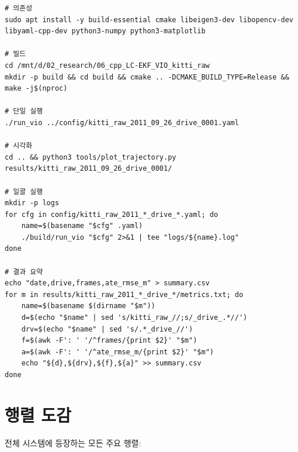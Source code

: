 \documentclass[11pt,a4paper,oneside]{report}
\begin{document}
\begin{lstlisting}[style=shell]
# 의존성
sudo apt install -y build-essential cmake libeigen3-dev libopencv-dev libyaml-cpp-dev python3-numpy python3-matplotlib

# 빌드
cd /mnt/d/02_research/06_cpp_LC-EKF_VIO_kitti_raw
mkdir -p build && cd build && cmake .. -DCMAKE_BUILD_TYPE=Release && make -j$(nproc)

# 단일 실행
./run_vio ../config/kitti_raw_2011_09_26_drive_0001.yaml

# 시각화
cd .. && python3 tools/plot_trajectory.py results/kitti_raw_2011_09_26_drive_0001/

# 일괄 실행
mkdir -p logs
for cfg in config/kitti_raw_2011_*_drive_*.yaml; do
    name=$(basename "$cfg" .yaml)
    ./build/run_vio "$cfg" 2>&1 | tee "logs/${name}.log"
done

# 결과 요약
echo "date,drive,frames,ate_rmse_m" > summary.csv
for m in results/kitti_raw_2011_*_drive_*/metrics.txt; do
    name=$(basename $(dirname "$m"))
    d=$(echo "$name" | sed 's/kitti_raw_//;s/_drive_.*//')
    drv=$(echo "$name" | sed 's/.*_drive_//')
    f=$(awk -F': ' '/^frames/{print $2}' "$m")
    a=$(awk -F': ' '/^ate_rmse_m/{print $2}' "$m")
    echo "${d},${drv},${f},${a}" >> summary.csv
done
\end{lstlisting}


\chapter{행렬 도감}

전체 시스템에 등장하는 모든 주요 행렬:
\end{document}
